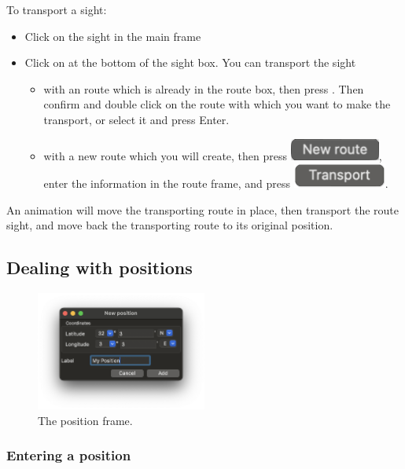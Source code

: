 \documentclass{ol-softwaremanual}
\begin{document}
To transport a sight: 
\begin{itemize}
\item Click on the sight in the main frame
\item Click on  at the bottom of the sight box. You can transport the sight
\begin{itemize}
\item with an route which is already in the route box, then press . Then confirm and double click on the route with which you want to make the transport, or select it and press Enter. 
\item with a new route which you will create, then press \includegraphics{figures/new-route-button.png}, enter the information in the route frame, and press \includegraphics{figures/routeframe-transport-button.png}. 
\end{itemize}
\end{itemize}
An animation will move the transporting route in place, then transport the route sight, and move back the transporting route to its original position. 


\subsection{Dealing with positions}\label{section-position}

\begin{figure}
  \centering
  \includegraphics[width=0.5\textwidth]{figures/position-frame.png}
  \caption{
    \label{fig-position-frame}
    The position frame.  
  }
\end{figure}

\subsubsection{Entering a position}\label{section-enter-position}
\end{document}
